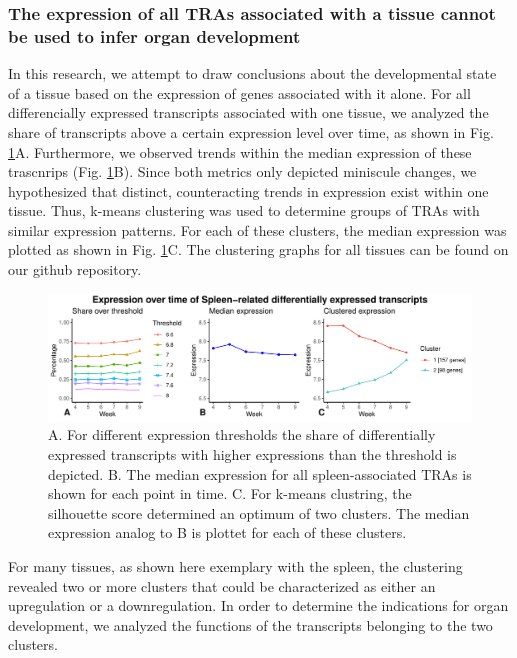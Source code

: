 \documentclass[
]{article}
\begin{document}
\hypertarget{organ-cluster}{%
\subsubsection{The expression of all TRAs associated with a tissue cannot be used to infer organ development}\label{organ-cluster}}

In this research, we attempt to draw conclusions about the developmental state of a tissue based on the expression of genes associated with it alone. For all differencially expressed transcripts associated with one tissue, we analyzed the share of transcripts above a certain expression level over time, as shown in Fig. \ref{fig:expression-plot}A. Furthermore, we observed trends within the median expression of these trascnrips (Fig. \ref{fig:expression-plot}B). Since both metrics only depicted miniscule changes, we hypothesized that distinct, counteracting trends in expression exist within one tissue. Thus, k-means clustering was used to determine groups of TRAs with similar expression patterns. For each of these clusters, the median expression was plotted as shown in Fig. \ref{fig:expression-plot}C. The clustering graphs for all tissues can be found on our github repository.

\begin{figure}
\centering
\includegraphics{final_report_files/figure-latex/expression-plot-1.pdf}
\caption{\label{fig:expression-plot}A. For different expression thresholds the share of differentially expressed transcripts with higher expressions than the threshold is depicted. B. The median expression for all spleen-associated TRAs is shown for each point in time. C. For k-means clustring, the silhouette score determined an optimum of two clusters. The median expression analog to B is plottet for each of these clusters.}
\end{figure}

For many tissues, as shown here exemplary with the spleen, the clustering revealed two or more clusters that could be characterized as either an upregulation or a downregulation. In order to determine the indications for organ development, we analyzed the functions of the transcripts belonging to the two clusters.
\end{document}
